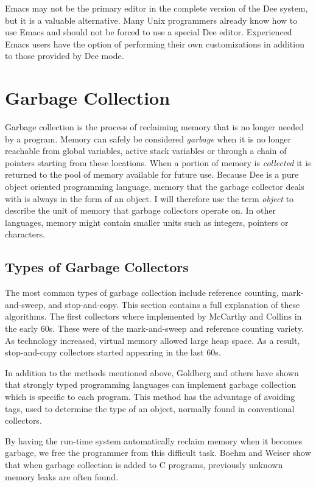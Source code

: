 Emacs may not be the primary editor in the complete version of
the Dee system, but it is a valuable alternative.  Many Unix
programmers already know how to use Emacs and should not be
forced to use a special Dee editor.  Experienced Emacs users
have the option of performing their own customizations in addition to
those provided by Dee mode.

\section{Garbage Collection}
\label{sec:gc}

Garbage collection is the process of reclaiming memory that is no
longer needed by a program.  Memory can safely be considered {\em
garbage} when it is no longer reachable from global variables, active
stack variables or through a chain of pointers starting from these
locations.  When a portion of memory is {\em collected} it is returned
to the pool of memory available for future use.  Because Dee is a pure
object oriented programming language, memory that the garbage
collector deals with is always in the form of an object.  I will
therefore use the term {\em object} to describe the unit of memory
that garbage collectors operate on.  In other languages, memory might
contain smaller units such as integers, pointers or characters.

\subsection{Types of Garbage Collectors}

The most common types of garbage collection include reference
counting, mark-and-sweep, and stop-and-copy.  This section contains a
full explanation of these algorithms.  The first collectors where
implemented by McCarthy \cite{Mccarthy60} and Collins \cite{Collins60}
in the early 60s.  These were of the mark-and-sweep and reference
counting variety.  As technology increased, virtual memory allowed
large heap space.  As a result, stop-and-copy collectors started
appearing in the last 60s.

In addition to the methods mentioned above, Goldberg and others
\cite{Goldberg91,Marshall70,Branquart70} have shown that strongly
typed programming languages can implement garbage collection which
is specific to each program.  This method has the advantage of
avoiding tags, used to determine the type of an object, normally found
in conventional collectors.

By having the run-time system automatically reclaim memory when it
becomes garbage, we free the programmer from this difficult task.
Boehm and Weiser \cite{Boehm88} show that when garbage collection is
added to C programs, previously unknown memory leaks are often found.

